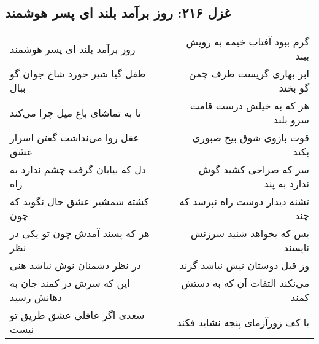 \begin{center}
\section*{غزل ۲۱۶: روز برآمد بلند ای پسر هوشمند}
\label{sec:216}
\begin{longtable}{l p{0.5cm} r}
روز برآمد بلند ای پسر هوشمند
&&
گرم ببود آفتاب خیمه به رویش ببند
\\
طفل گیا شیر خورد شاخ جوان گو ببال
&&
ابر بهاری گریست طرف چمن گو بخند
\\
تا به تماشای باغ میل چرا می‌کند
&&
هر که به خیلش درست قامت سرو بلند
\\
عقل روا می‌نداشت گفتن اسرار عشق
&&
قوت بازوی شوق بیخ صبوری بکند
\\
دل که بیابان گرفت چشم ندارد به راه
&&
سر که صراحی کشید گوش ندارد به پند
\\
کشته شمشیر عشق حال نگوید که چون
&&
تشنه دیدار دوست راه نپرسد که چند
\\
هر که پسند آمدش چون تو یکی در نظر
&&
بس که بخواهد شنید سرزنش ناپسند
\\
در نظر دشمنان نوش نباشد هنی
&&
وز قبل دوستان نیش نباشد گزند
\\
این که سرش در کمند جان به دهانش رسید
&&
می‌نکند التفات آن که به دستش کمند
\\
سعدی اگر عاقلی عشق طریق تو نیست
&&
با کف زورآزمای پنجه نشاید فکند
\\
\end{longtable}
\end{center}
